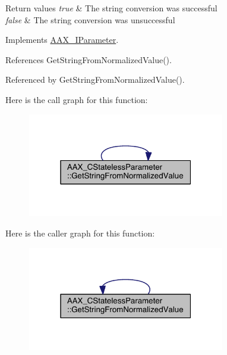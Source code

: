 \begin{DoxyRetVals}{Return values}
{\em true} & The string conversion was successful \\
\hline
{\em false} & The string conversion was unsuccessful \\
\hline
\end{DoxyRetVals}


Implements \hyperlink{a00108_a9339e5ef2545f22fe95f6c6ab40ee3aa}{A\+A\+X\+\_\+\+I\+Parameter}.



References Get\+String\+From\+Normalized\+Value().



Referenced by Get\+String\+From\+Normalized\+Value().



Here is the call graph for this function\+:
\nopagebreak
\begin{figure}[H]
\begin{center}
\leavevmode
\includegraphics[width=244pt]{a00040_a6214a4695955aaca731e3ec277db2d21_cgraph}
\end{center}
\end{figure}




Here is the caller graph for this function\+:
\nopagebreak
\begin{figure}[H]
\begin{center}
\leavevmode
\includegraphics[width=244pt]{a00040_a6214a4695955aaca731e3ec277db2d21_icgraph}
\end{center}
\end{figure}


